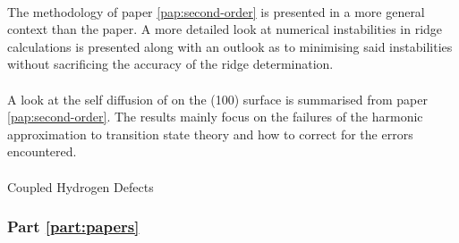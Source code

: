 \paragraph{}
The methodology of paper \ref{pap:second-order} is presented in a more general context than the paper.
A more detailed look at numerical instabilities in ridge calculations is presented along with an outlook as to minimising said instabilities without sacrificing the accuracy of the ridge determination.

\paragraph{}
A look at the self diffusion of  on the (100) surface is summarised from paper \ref{pap:second-order}.
The results mainly focus on the failures of the harmonic approximation to transition state theory and how to correct for the errors encountered.

\paragraph{}
Coupled Hydrogen Defects \expand

\subsubsection{Part \ref{part:papers}}
\placeholder
